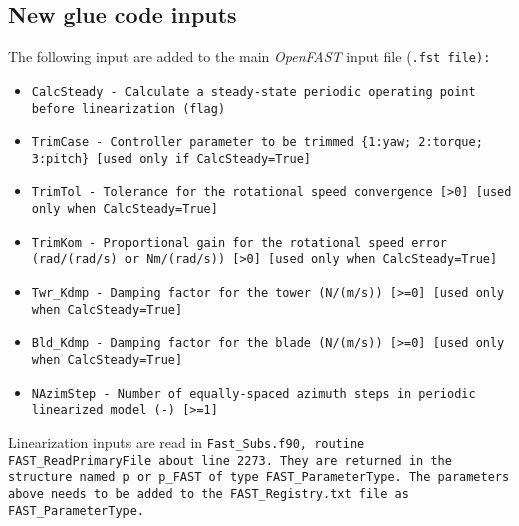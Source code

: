 \documentclass[11pt]{article}
\newcommand{\question}[1]{{\color{red}{#1}}}
\begin{document}
\subsection{New glue code inputs}
\label{sec:newinputs}
The following input are added to the main \textit{OpenFAST} input file (\tt{.fst} file):
\begin{itemize}\tightlist
    \item \tt{CalcSteady - Calculate a steady-state periodic operating point before linearization  (flag)}
    \item \tt{TrimCase   - Controller parameter to be trimmed \{1:yaw; 2:torque; 3:pitch\} [used only if CalcSteady=True]}
    \item \tt{TrimTol    - Tolerance for the rotational speed convergence [>0] [used only when CalcSteady=True] }
    \item \tt{TrimKom    - Proportional gain for the rotational speed error (rad/(rad/s) or Nm/(rad/s)) [>0] [used only when CalcSteady=True] }
    \item \tt{Twr\_Kdmp   - Damping factor for the tower (N/(m/s)) [>=0] [used only when CalcSteady=True] }
    \item \tt{Bld\_Kdmp  - Damping factor for the blade (N/(m/s)) [>=0] [used only when CalcSteady=True] }
    \item \tt{NAzimStep  - Number of equally-spaced azimuth steps in periodic linearized model (-) [>=1] }
\end{itemize}
\question{Do we want to adjust more damping values?}
Linearization inputs are read in \tt{Fast\_Subs.f90}, routine \tt{FAST\_ReadPrimaryFile} about line 2273. They are returned in the structure named \tt{p} or \tt{p\_FAST} of type \tt{FAST\_ParameterType}. The parameters above needs to be added to the \tt{FAST\_Registry.txt} file as \tt{FAST\_ParameterType}.
\end{document}
